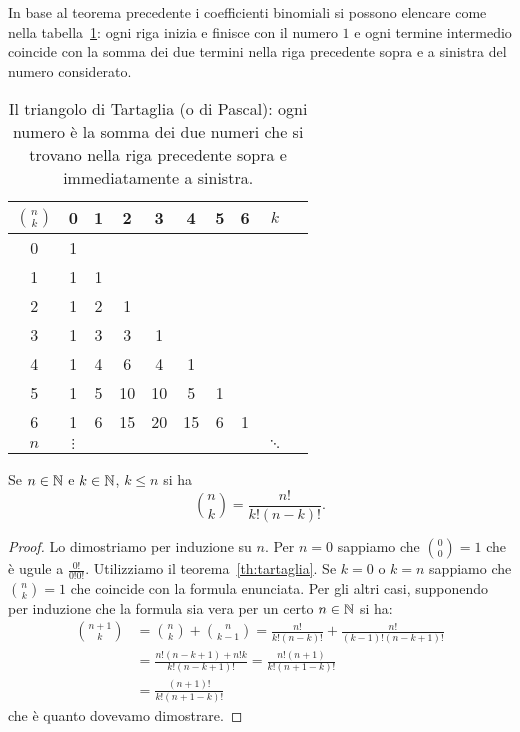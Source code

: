   In base al teorema precedente i coefficienti binomiali si possono
  elencare come nella tabella~\ref{tab:binomiali}:
  ogni riga inizia e finisce con il numero $1$
  e ogni termine intermedio coincide con la somma dei
  due termini nella riga precedente sopra e
  a sinistra del numero considerato.
  
  \begin{table}
  \begin{tabular}{c|ccccccccc}
  $\displaystyle{n \choose k}$& 0 & 1 & 2 & 3 & 4 & 5 & 6 & $k$ &\\ \hline
    0 & 1 &   &   &   &   &   &   & &\\
    1 & 1 & 1 &   &   &   &   &   & &\\
    2 & 1 & 2 & 1 &   &   &   &   & &\\
    3 & 1 & 3 & 3 & 1 &   &   &   & &\\
    4 & 1 & 4 & 6 & 4 & 1 &   &   & &\\
    5 & 1 & 5 & 10& 10& 5 & 1 &   & &\\
    6 & 1 & 6 & 15& 20& 15& 6 & 1 & &\\
  $n$ &$\vdots$&&   &   &   &   &   & $\ddots$ &
  \end{tabular}
  \caption{Il triangolo di Tartaglia (o di Pascal):
  ogni numero è la somma dei due numeri che si trovano 
  nella riga precedente sopra e immediatamente a sinistra.}
  \label{tab:binomiali}
  \end{table}
  
  \begin{theorem}
  \mymark{***}%
  Se $n\in \mathbb N$ e $k\in \mathbb N$, $k\le n$
  si ha 
  \[
  {n \choose k}  
  = \frac{n!}{k!(n-k)!}.  
  \]
  \end{theorem}
  \begin{proof}
  Lo dimostriamo per induzione su $n$.
  Per $n=0$ sappiamo che ${0 \choose 0} = 1$ che 
  è ugule a $\frac{0!}{0!0!}$.
  Utilizziamo il teorema~\ref{th:tartaglia}.
  Se $k=0$ o $k=n$ sappiamo che ${n \choose k}=1$ che coincide 
  con la formula enunciata. 
  Per gli altri casi, supponendo per induzione che la formula sia 
  vera per un certo $n\in \mathbb N$ si ha: 
  \begin{align*}
   {n+1 \choose k} 
   &= {n \choose k} + {n \choose k-1}
   =  \frac{n!}{k!(n-k)!} + \frac{n!}{(k-1)!(n-k+1)!} \\
   &= \frac{n!(n-k+1) + n! k}{k!(n-k+1)!}
   = \frac{n!(n+1)}{k!(n+1-k)!} \\
   &= \frac{(n+1)!}{k!(n+1-k)!}
  \end{align*}
  che è quanto dovevamo dimostrare.
\end{proof}

